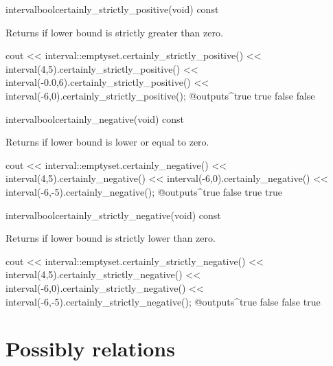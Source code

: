 \documentclass{manual}
\newcommand{\itv}[2]{\ensuremath{[#1,\,#2]}}
\begin{document}
\begin{defmethod}{interval}{bool}{certainly\_strictly\_positive}{(void) const}
  \begin{operation}
    \op{$\code{self}\subset\itv{0}{+\infty}$}
  \end{operation}
Returns  if  lower bound is strictly greater than zero.
\begin{example}
cout << interval::emptyset.certainly_strictly_positive()
     << interval(4,5).certainly_strictly_positive()
     << interval(-0.0,6).certainly_strictly_positive()
     << interval(-6,0).certainly_strictly_positive();
@outputs^true true false false~
\end{example}
\end{defmethod}

\begin{defmethod}{interval}{bool}{certainly\_negative}{(void) const}
  \begin{operation}
    \op{$\code{self}\subseteq\itv{-\infty}{0}$}
  \end{operation}
Returns  if  lower bound is lower or equal to zero.
\begin{example}
cout << interval::emptyset.certainly_negative()
     << interval(4,5).certainly_negative()
     << interval(-6,0).certainly_negative()
     << interval(-6,-5).certainly_negative();
@outputs^true false true true~
\end{example}
\end{defmethod}

\begin{defmethod}{interval}{bool}{certainly\_strictly\_negative}{(void) const}
  \begin{operation}
    \op{$\code{self}\subset\itv{-\infty}{0}$}
  \end{operation}
Returns  if  lower bound is strictly lower than zero.
\begin{example}
cout << interval::emptyset.certainly_strictly_negative()
     << interval(4,5).certainly_strictly_negative()
     << interval(-6,0).certainly_strictly_negative()
     << interval(-6,-5).certainly_strictly_negative();
@outputs^true false false true~
\end{example}
\end{defmethod}

\section{Possibly relations}
\end{document}
